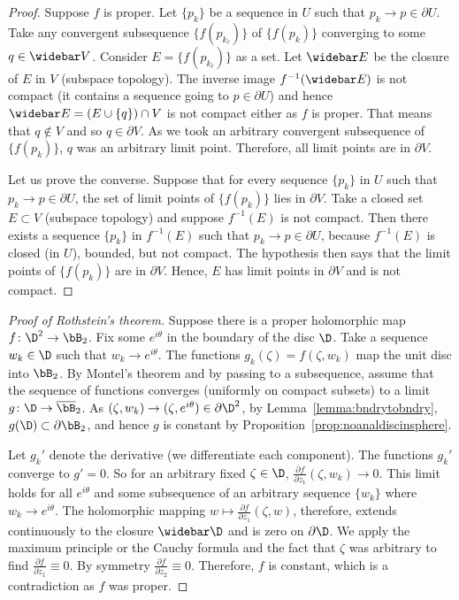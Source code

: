 \begin{proof}
Suppose $f$ is proper. Let $\{p_k\}$ be a sequence in $U$ such that $p_k\to p\in\partial U$. Take any convergent subsequence $\bigl\{f(p_{k_\ell})\bigr\}$ of $\bigl\{f(p_k)\bigr\}$ converging to some $q\in\widebar V$. Consider $E=\bigl\{f(p_{k_\ell})\bigr\}$ as a set. Let $\widebar E$ be the closure of $E$ in $V$ (subspace topology). The inverse image $f^{-1}(\widebar E)$ is not compact (it contains a sequence going to $p\in\partial U$) and hence $\widebar E=(E\cup\{q\})\cap V$ is not compact either as $f$ is proper. That means that $q\notin V$ and so $q\in\partial V$. As we took an arbitrary convergent subsequence of $\bigl\{f(p_k)\bigr\}$, $q$ was an arbitrary limit point. Therefore, all limit points are in $\partial V$.

Let us prove the converse. Suppose that for every sequence $\{p_k\}$ in $U$ such that $p_k\to p\in\partial U$, the set of limit points of $\bigl\{f(p_k)\bigr\}$ lies in $\partial V$. Take a closed set $E\subset V$ (subspace topology) and suppose $f^{-1}(E)$ is not compact. Then there exists a sequence $\{p_k\}$ in $f^{-1}(E)$ such that $p_k\to p\in\partial U$, because $f^{-1}(E)$ is closed (in $U$), bounded, but not compact. The hypothesis then says that the limit points of $\bigl\{f(p_k)\bigr\}$ are in $\partial V$. Hence, $E$ has limit points in $\partial V$ and is not compact.
\end{proof}
\begin{proof}[Proof of Rothstein's theorem]
Suppose there is a proper holomorphic map $f\colon\D^2\to\bB_2$. Fix some $e^{i\theta}$ in the boundary of the disc $\D$. Take a sequence $w_k\in\D$ such that $w_k\to e^{i\theta}$. The functions $g_k(\zeta)=f(\zeta,w_k)$ map the unit disc into $\bB_2$. By Montel's theorem and by passing to a subsequence, assume that the sequence of functions converges (uniformly on compact subsets) to a limit $g\colon\D\to\overline{\bB}_2$. As $(\zeta,w_k)\to(\zeta,e^{i\theta})\in\partial\D^2$, by Lemma~\ref{lemma:bndrytobndry}, $g(\D)\subset\partial\bB_2$, and hence $g$ is constant by Proposition~\ref{prop:noanaldiscinsphere}.

Let $g_k'$ denote the derivative (we differentiate each component). The functions $g_k'$ converge to $g'=0$. So for an arbitrary fixed $\zeta\in\D$, $\frac{\partial f}{\partial z_1}(\zeta,w_k)\to0$. This limit holds for all $e^{i\theta}$ and some subsequence of an arbitrary sequence $\{w_k\}$ where $w_k\to e^{i\theta}$. The holomorphic mapping $w\mapsto\frac{\partial f}{\partial z_1}(\zeta,w)$, therefore, extends continuously to the closure $\widebar\D$ and is zero on $\partial\D$. We apply the maximum principle or the Cauchy formula and the fact that $\zeta$ was arbitrary to find $\frac{\partial f}{\partial z_1}\equiv0$. By symmetry $\frac{\partial f}{\partial z_2}\equiv0$. Therefore, $f$ is constant, which is a contradiction as $f$ was proper.
\end{proof}
